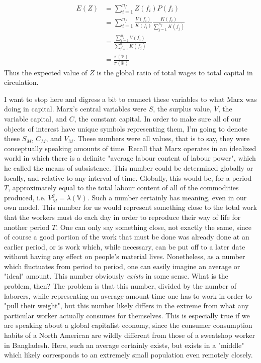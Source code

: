 \begin{align}
	E(Z) &= \sum_{i=1}^{n_f} Z(f_i)P(f_i) \\
		&= \sum_{i=1}^{n_f} \frac{V(f_i)}{K(f_i)} \frac{K(f_i)}{\sum_{j=1}^{n_f} K(f_j)} \\
		&= \frac{\sum_{i=1}^{n_f} V(f_i)}{\sum_{j=1}^{n_f} K(f_j)} \\
		&= \frac{\pi(\mathbb{V})}{\pi(\mathbb{K})} 
\end{align}
Thus the expected value of $Z$ is the global ratio of total wages to total capital in circulation. \par 
I want to stop here and digress a bit to connect these variables to what Marx was doing in capital. Marx's central variables were $S$, the surplus value, $V$, the variable capital, and $C$, the constant capital. In order to make sure all of our objects of interest have unique symbols representing them, I'm going to denote these $S_M$, $C_M$, and $V_M$. These numbers were all values, that is to say, they were conceptually speaking amounts of time. Recall that Marx operates in an idealized world in which there is a definite "average labour content of labour power", which he called the means of subsistence. This number could be determined globally or locally, and relative to any interval of time. Globally, this would be, for a period $T$, approximately equal to the total labour content of all of the commodities produced, i.e. $V_M^g = \lambda(\mathbb{V})$. Such a number certainly has meaning, even in our own model. This number for us would represent something close to the total work that the workers must do each day in order to reproduce their way of life for another period $T$. One can only say something close, not exactly the same, since of course a good portion of the work that must be done was already done at an earlier period, or is work which, while necessary, can be put off to a later date without having any effect on people's material lives. Nonetheless, as a number which fluctuates from period to period, one can easily imagine an average or "ideal" amount. This number obviously \textit{exists} in some sense. What is the problem, then? The problem is that this number, divided by the number of laborers, while representing an average amount time one has to work in order to "pull their weight", but this number likely differs in the extreme from what any particular worker actually consumes for themselves. This is especially true if we are speaking about a global capitalist economy, since the consumer consumption habits of a North American are wildly different from those of a sweatshop worker in Bangladesh. Here, such an average certainly exists, but exists in a "middle" which likely corresponds to an extremely small population even remotely closely. \par 
